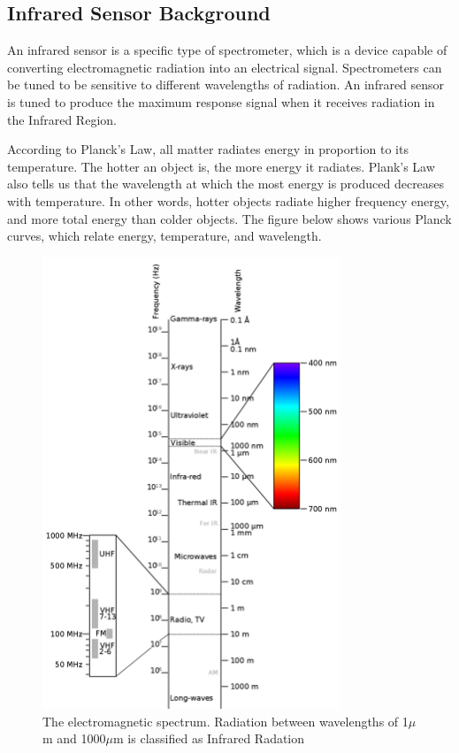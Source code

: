 \documentclass[12pt,journal,compsoc]{IEEEtran}
\begin{document}
\subsection{Infrared Sensor Background}
An infrared sensor is a specific type of spectrometer, which is a device capable of converting electromagnetic radiation into an electrical signal. Spectrometers can be tuned to be sensitive to different wavelengths of radiation. An infrared sensor is tuned to produce the maximum response signal when it receives radiation in the Infrared Region. 

According to Planck's Law, all matter radiates energy in proportion to its temperature. The hotter an object is, the more energy it radiates. Plank's Law also tells us that the wavelength at which the most energy is produced decreases with temperature. In other words, hotter objects radiate higher frequency energy, and more total energy than colder objects. The figure below shows various Planck curves, which relate energy, temperature, and wavelength.

\begin{figure}[h]
\centering
\includegraphics[width=3.5in]{em_spectrum.png}
\caption{The electromagnetic spectrum. Radiation between wavelengths of 1$\mu$m and 1000$\mu$m is classified as Infrared Radation}
\label{em_spectrum_image}
\end{figure}
\end{document}
